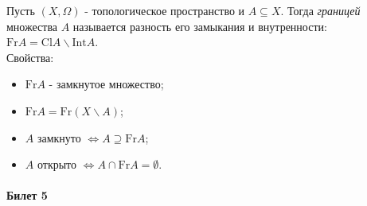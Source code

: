 \documentclass[a4paper,100pt]{article}
\theoremstyle{indented}
\begin{document}
Пусть $(X, \Omega)$ - топологическое пространство и $A\subseteq X$. Тогда \textit{границей} множества $A$ называется разность его замыкания и внутренности: $\text{Fr}A = \text{Cl}A\backslash \text{Int}A$. \\

Свойства:
\begin{itemize}

    \item $\text{Fr} A$ - замкнутое множество;
    \item $\text{Fr} A = \text{Fr}(X\backslash A)$;
    \item $A$ замкнуто $\Leftrightarrow A \supseteq \text{Fr} A$;
    \item $A$ открыто $\Leftrightarrow A \cap \text{Fr} A = \emptyset$.

\end{itemize}

\paragraph{Билет 5} \

\medskip
\end{document}
